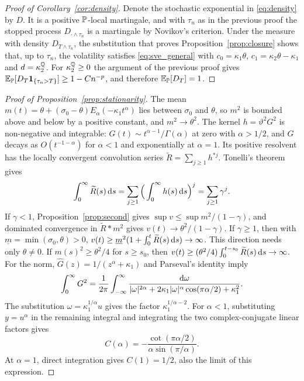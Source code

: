 \begin{proof}[Proof of Corollary~\ref{cor:density}] Denote the stochastic exponential in \eqref{eq:density} by $D$. It is a positive $\P$-local martingale, and with $\tau_n$ as in the previous proof the stopped process $D_{\cdot\wedge\tau_n}$ is a martingale by Novikov's criterion. Under the measure with density $D_{T\wedge\tau_n}$, the substitution that proves Proposition~\ref{prop:closure} shows that, up to $\tau_n$, the volatility satisfies \eqref{eq:sve_general} with $c_0=\kappa_1\theta$, $c_1=\kappa_2\theta-\kappa_1$ and $d=\kappa_2^{\Q}$. For $\kappa_2^{\Q}\ge0$ the argument of the previous proof gives $\E_{\P}[D_T\one_{\{\tau_n>T\}}]\ge1-Cn^{-p}$, and therefore $\E_{\P}[D_T]=1$.
\end{proof}


\begin{proof}[Proof of Proposition~\ref{prop:stationarity}] The mean $m(t)=\theta+(\sigma_0-\theta)E_\alpha(-\kappa_1t^\alpha)$ lies between $\sigma_0$ and $\theta$, so $m^2$ is bounded above and below by a positive constant, and $m^2\to\theta^2$. The kernel $h=\vartheta^2G^2$ is non-negative and integrable: $G(t)\sim t^{\alpha-1}/\Gamma(\alpha)$ at zero with $\alpha>1/2$, and $G$ decays as $O(t^{-1-\alpha})$ for $\alpha<1$ and exponentially at $\alpha=1$. Its positive resolvent has the locally convergent convolution series $\widetilde R=\sum_{j\ge1}h^{*j}$. Tonelli's theorem gives
\begin{equation*}
\int_0^\infty\widetilde R(s)\,\D s
=\sum_{j\ge1}\Big(\int_0^\infty h(s)\,\D s\Big)^j
=\sum_{j\ge1}\gamma^j.
\end{equation*}
If $\gamma<1$, Proposition~\ref{prop:second} gives $\sup v\le\sup m^2/(1-\gamma)$, and dominated convergence in $\widetilde R*m^2$ gives $v(t)\to\theta^2/(1-\gamma)$. If $\gamma\ge1$, then with $\underline m=\min(\sigma_0,\theta)>0$,
$v(t)\ge\underline m^2(1+\int_0^t\widetilde R(s)\,\D s)\to\infty$.
This direction needs only $\theta\ne0$. If $m(s)^2\ge\theta^2/4$ for $s\ge s_0$, then $v(t)\ge(\theta^2/4)\int_0^{t-s_0}\widetilde R(s)\,\D s\to\infty$.
For the norm, $\widehat G(z)=1/(z^\alpha+\kappa_1)$ and Parseval's identity imply
\begin{equation*}
\int_0^\infty G^2=\frac1{2\pi}\int_{-\infty}^\infty
\frac{\D\omega}{|\omega|^{2\alpha}+2\kappa_1|\omega|^\alpha\cos(\pi\alpha/2)+\kappa_1^2}.
\end{equation*}
The substitution $\omega=\kappa_1^{1/\alpha}u$ gives the factor $\kappa_1^{1/\alpha-2}$. For $\alpha<1$, substituting $y=u^\alpha$ in the remaining integral and integrating the two complex-conjugate linear factors gives
\begin{equation*}
C(\alpha)=-\frac{\cot(\pi\alpha/2)}{\alpha\sin(\pi/\alpha)}.
\end{equation*}
At $\alpha=1$, direct integration gives $C(1)=1/2$, also the limit of this expression.
\end{proof}

